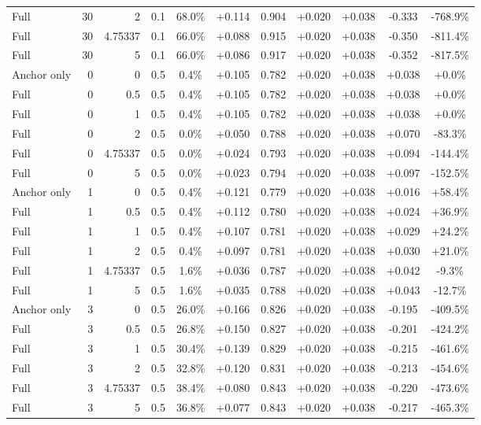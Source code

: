 \begin{table}[htbp]
\begin{tabular}{lrrrccccccc}
Full & 30 & 2 & 0.1 & 68.0\% & +0.114 & 0.904 & +0.020 & +0.038 & -0.333 & -768.9\% \\
Full & 30 & 4.75337 & 0.1 & 66.0\% & +0.088 & 0.915 & +0.020 & +0.038 & -0.350 & -811.4\% \\
Full & 30 & 5 & 0.1 & 66.0\% & +0.086 & 0.917 & +0.020 & +0.038 & -0.352 & -817.5\% \\
Anchor only & 0 & 0 & 0.5 & 0.4\% & +0.105 & 0.782 & +0.020 & +0.038 & +0.038 & +0.0\% \\
Full & 0 & 0.5 & 0.5 & 0.4\% & +0.105 & 0.782 & +0.020 & +0.038 & +0.038 & +0.0\% \\
Full & 0 & 1 & 0.5 & 0.4\% & +0.105 & 0.782 & +0.020 & +0.038 & +0.038 & +0.0\% \\
Full & 0 & 2 & 0.5 & 0.0\% & +0.050 & 0.788 & +0.020 & +0.038 & +0.070 & -83.3\% \\
Full & 0 & 4.75337 & 0.5 & 0.0\% & +0.024 & 0.793 & +0.020 & +0.038 & +0.094 & -144.4\% \\
Full & 0 & 5 & 0.5 & 0.0\% & +0.023 & 0.794 & +0.020 & +0.038 & +0.097 & -152.5\% \\
Anchor only & 1 & 0 & 0.5 & 0.4\% & +0.121 & 0.779 & +0.020 & +0.038 & +0.016 & +58.4\% \\
Full & 1 & 0.5 & 0.5 & 0.4\% & +0.112 & 0.780 & +0.020 & +0.038 & +0.024 & +36.9\% \\
Full & 1 & 1 & 0.5 & 0.4\% & +0.107 & 0.781 & +0.020 & +0.038 & +0.029 & +24.2\% \\
Full & 1 & 2 & 0.5 & 0.4\% & +0.097 & 0.781 & +0.020 & +0.038 & +0.030 & +21.0\% \\
Full & 1 & 4.75337 & 0.5 & 1.6\% & +0.036 & 0.787 & +0.020 & +0.038 & +0.042 & -9.3\% \\
Full & 1 & 5 & 0.5 & 1.6\% & +0.035 & 0.788 & +0.020 & +0.038 & +0.043 & -12.7\% \\
Anchor only & 3 & 0 & 0.5 & 26.0\% & +0.166 & 0.826 & +0.020 & +0.038 & -0.195 & -409.5\% \\
Full & 3 & 0.5 & 0.5 & 26.8\% & +0.150 & 0.827 & +0.020 & +0.038 & -0.201 & -424.2\% \\
Full & 3 & 1 & 0.5 & 30.4\% & +0.139 & 0.829 & +0.020 & +0.038 & -0.215 & -461.6\% \\
Full & 3 & 2 & 0.5 & 32.8\% & +0.120 & 0.831 & +0.020 & +0.038 & -0.213 & -454.6\% \\
Full & 3 & 4.75337 & 0.5 & 38.4\% & +0.080 & 0.843 & +0.020 & +0.038 & -0.220 & -473.6\% \\
Full & 3 & 5 & 0.5 & 36.8\% & +0.077 & 0.843 & +0.020 & +0.038 & -0.217 & -465.3\% \\

\end{tabular}
\end{table}
